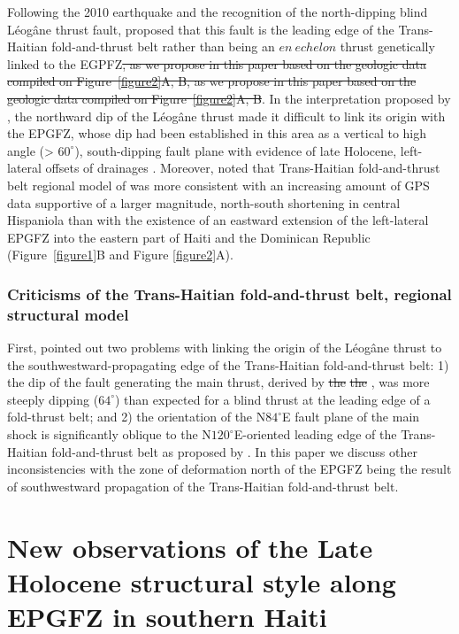 \documentclass[linenumbers,draft]{agujournal}
\providecommand{\DIFdel}[1]{{\protect\color{red}\sout{#1}}}                      %
\providecommand{\DIFaddbegin}{} %
\providecommand{\DIFaddend}{} %
\providecommand{\DIFdelbegin}{} %
\providecommand{\DIFdelend}{} %
\begin{document}
Following the 2010 earthquake and the recognition of the north-dipping blind L\'eog\^ane thrust fault, \citet{calais2010transpressional} proposed that this fault is the leading edge of the Trans-Haitian fold-and-thrust belt rather than being an $en~echelon$ thrust genetically linked to the EGPFZ\DIFdelbegin \DIFdel{, as we propose in this paper based on the geologic data compiled on Figure~\ref{figure2}A, B}\DIFdelend \DIFaddbegin \st{, as we propose in this paper based on the geologic data compiled on Figure~{\ref{figure2}}A, B}\DIFaddend . In the interpretation proposed by \citet{calais2010transpressional}, the northward dip of the L\'eog\^ane thrust made it difficult to link its origin with the EPGFZ, whose dip had been established in this area as a vertical to high angle (> $60^{\circ}$), south-dipping fault plane with evidence of late Holocene, left-lateral offsets of drainages \citep{prentice2010seismic}. Moreover, \citet{symithe2016present} noted that Trans-Haitian fold-and-thrust belt regional model of \citet{pubellier2000plate} was more consistent with an increasing amount of GPS data supportive of a larger magnitude, north-south shortening in central Hispaniola than with the existence of an eastward extension of the left-lateral EPGFZ into the eastern part of Haiti and the Dominican Republic (Figure~\ref{figure1}B and Figure \ref{figure2}A).

\subsubsection{Criticisms of the Trans-Haitian fold-and-thrust belt, regional structural model}
First, \citet{mercier20112010} pointed out two problems with linking the origin of the L\'eog\^ane thrust to the southwestward-propagating edge of the Trans-Haitian fold-and-thrust belt: 1) the dip of the fault generating the main thrust, derived by \DIFdelbegin \DIFdel{the }\DIFdelend \DIFaddbegin \st{the} \DIFaddend \citet{mercier20112010}, was more steeply dipping ($64^{\circ}$) than expected for a blind thrust at the leading edge of a fold-thrust belt; and 2) the orientation of the N$84^{\circ}$E fault plane of the main shock is significantly oblique to the N$120^{\circ}$E-oriented leading edge of the Trans-Haitian fold-and-thrust belt as proposed by \citet{pubellier2000plate}. In this paper we discuss other inconsistencies with the zone of deformation north of the EPGFZ being the result of southwestward propagation of the Trans-Haitian fold-and-thrust belt.

\section{New observations of the Late Holocene structural style along EPGFZ in southern Haiti}
\end{document}
